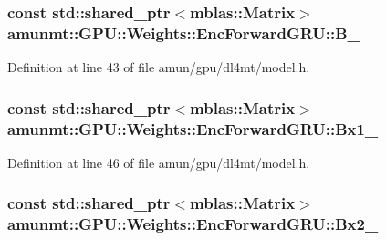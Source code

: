 \subsubsection[{\texorpdfstring{B\+\_\+}{B_}}]{\setlength{\rightskip}{0pt plus 5cm}const std\+::shared\+\_\+ptr$<${\bf mblas\+::\+Matrix}$>$ amunmt\+::\+G\+P\+U\+::\+Weights\+::\+Enc\+Forward\+G\+R\+U\+::\+B\+\_\+}\hypertarget{structamunmt_1_1GPU_1_1Weights_1_1EncForwardGRU_a482b65836b9c4cb68783b1e91f5d14cd}{}\label{structamunmt_1_1GPU_1_1Weights_1_1EncForwardGRU_a482b65836b9c4cb68783b1e91f5d14cd}


Definition at line 43 of file amun/gpu/dl4mt/model.\+h.

\subsubsection[{\texorpdfstring{Bx1\+\_\+}{Bx1_}}]{\setlength{\rightskip}{0pt plus 5cm}const std\+::shared\+\_\+ptr$<${\bf mblas\+::\+Matrix}$>$ amunmt\+::\+G\+P\+U\+::\+Weights\+::\+Enc\+Forward\+G\+R\+U\+::\+Bx1\+\_\+}\hypertarget{structamunmt_1_1GPU_1_1Weights_1_1EncForwardGRU_a0d8c4c1e3a4fe0d1a0b1c6bf8b80a042}{}\label{structamunmt_1_1GPU_1_1Weights_1_1EncForwardGRU_a0d8c4c1e3a4fe0d1a0b1c6bf8b80a042}


Definition at line 46 of file amun/gpu/dl4mt/model.\+h.

\subsubsection[{\texorpdfstring{Bx2\+\_\+}{Bx2_}}]{\setlength{\rightskip}{0pt plus 5cm}const std\+::shared\+\_\+ptr$<${\bf mblas\+::\+Matrix}$>$ amunmt\+::\+G\+P\+U\+::\+Weights\+::\+Enc\+Forward\+G\+R\+U\+::\+Bx2\+\_\+}\hypertarget{structamunmt_1_1GPU_1_1Weights_1_1EncForwardGRU_ad16fb19adaf880ab2d9139dfde0145e1}{}\label{structamunmt_1_1GPU_1_1Weights_1_1EncForwardGRU_ad16fb19adaf880ab2d9139dfde0145e1}


